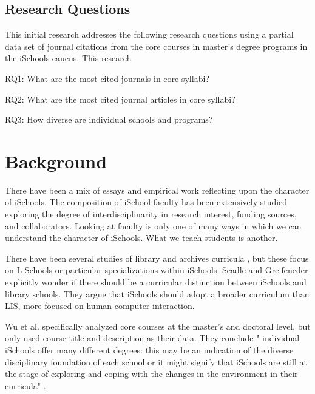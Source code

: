 \documentclass[10pt, letterpaper]{article}
\begin{document}
\subsection{Research Questions}
This initial research addresses the following research questions using a partial data set of journal citations from the core courses in master's degree programs in the iSchools caucus. This research 
\begin{compactitem}
	\item RQ1: What are the most cited journals in core syllabi?
	\item RQ2: What are the most cited journal articles in core syllabi?
	\item RQ3: How diverse are individual schools and programs?
\end{compactitem}

\section{Background}
There have been a mix of essays and empirical work reflecting upon the character of iSchools. The composition of iSchool faculty has been extensively studied \cite{wiggins_intellectual_2012, holmberg_conceptual_2013, wu_state_2012, chen_thematic_2008} exploring the degree of interdisciplinarity in research interest, funding sources, and collaborators. Looking at faculty is only one of many ways in which we can understand the character of iSchools. What we teach students is another.

There have been several studies of library \cite{subramaniam_weaving_2010, wedgeworth_robert_certain_2013, corrall_educating_2010} and archives curricula \cite{bastian_are_2005, bastian_towards_2006}, but these focus on L-Schools or particular specializations within iSchools. Seadle and Greifeneder \citeyear{seadle_envisioning_2007} explicitly wonder if there should be a curricular distinction between iSchools and library schools. They argue that iSchools should adopt a broader curriculum than LIS, more focused on human-computer interaction.

Wu et al. \citeyear{wu_state_2012} specifically analyzed core courses at the master's and doctoral level, but only used course title and description as their data. They conclude " individual iSchools offer many different degrees: this may be an indication of the diverse disciplinary foundation of each school or it might signify that iSchools are still at the stage of exploring and coping with the changes in the environment in their curricula" \cite[p. 32]{wu_state_2012}.
\end{document}
